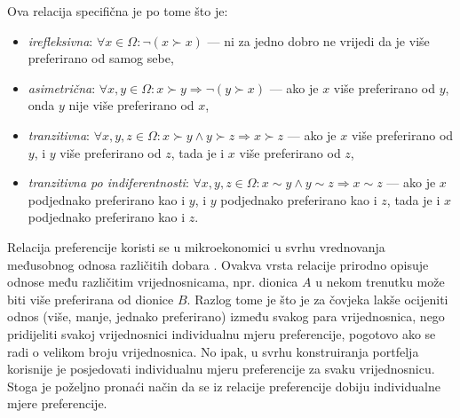 \documentclass[lmodern, utf8, diplomski, numeric]{fer}
\newcommand{\q}{\left}
\newcommand{\w}{\right}
\begin{document}
  Ova relacija specifična je po tome što je:
  \begin{itemize}
    \item \textit{irefleksivna}: $\forall x \in \Omega\colon \neg \q( x \succ x \w)$ --- ni za jedno dobro ne vrijedi da je više preferirano od samog sebe,
    \item \textit{asimetrična}: $\forall x, y \in \Omega\colon x \succ y \Rightarrow \neg \q( y \succ x \w)$ --- ako je $x$ više preferirano od $y$, onda $y$ nije više preferirano od $x$,
    \item \textit{tranzitivna}: $\forall x, y, z \in \Omega\colon x \succ y \wedge y \succ z \Rightarrow x \succ z$ --- ako je $x$ više preferirano od $y$, i $y$ više preferirano od $z$, tada je i $x$ više preferirano od $z$,
    \item \textit{tranzitivna po indiferentnosti}: $\forall x, y, z \in \Omega\colon x \sim y \wedge y \sim z \Rightarrow x \sim z$ --- ako je $x$ podjednako preferirano kao i $y$, i $y$ podjednako preferirano kao i $z$, tada je i $x$ podjednako preferirano kao i $z$.
  \end{itemize}
  
  Relacija preferencije koristi se u mikroekonomici u svrhu vrednovanja međusobnog odnosa različitih dobara \citep{inzeko}.
  Ovakva vrsta relacije prirodno opisuje odnose među različitim vrijednosnicama, npr. dionica $A$ u nekom trenutku može biti više preferirana od dionice $B$.
  Razlog tome je što je za čovjeka lakše ocijeniti odnos (više, manje, jednako preferirano) između svakog para vrijednosnica, nego pridijeliti svakoj vrijednosnici individualnu mjeru preferencije, pogotovo ako se radi o velikom broju vrijednosnica.
  No ipak, u svrhu konstruiranja portfelja korisnije je posjedovati individualnu mjeru preferencije za svaku vrijednosnicu.
  Stoga je poželjno pronaći način da se iz relacije preferencije dobiju individualne mjere preferencije.
  
\end{document}

